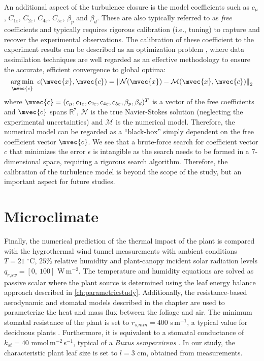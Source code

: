 An additional aspect of the turbulence closure is the model coefficients such as $c_{\mu}$, $C_{1\varepsilon}$, $C_{2\varepsilon}$, $C_{4\varepsilon}$, $C_{5\varepsilon}$, $\beta_p$ and $\beta_d$. These are also typically referred to as \textit{free} coefficients and typically requires rigorous calibration (i.e., tuning) to capture and recover the experimental observations. The calibration of these coefficient to the experiment results can be described as an optimization problem \citep{Margheri2014, Duraisamy2018, Couplet2005, Najm2009, Lucor2007, Gorle2015a}, where data assimilation techniques are well regarded as an effective methodology to ensure the accurate, efficient convergence to global optima:
\begin{equation}
\mathop {\arg \min }\limits_{\mvec{c}}\ \epsilon(\mvec{x}, \mvec{c}) = \left\| {\mathcal{N}(\mvec{x}) - \mathcal{M}(\mvec{x},\mvec{c})} \right\|_2 
\end{equation}
where $\mvec{c}=({{c_\mu },{c_{1\varepsilon }},{c_{2\varepsilon }},{c_{4\varepsilon }},{c_{5\varepsilon }},{\beta _p},{\beta _d}})^T$ is a vector of the free coefficients and $\mvec{c}$ spans $\mathbb{R}^7$, $\mathcal{N}$ is the true Navier-Stokes solution (neglecting the experimental uncertainties) and $\mathcal{M}$ is the numerical model. Therefore, the numerical model can be regarded as a ``black-box'' simply dependent on the free coefficient vector $\mvec{c}$. We see that a brute-force search for coefficient vector $c$ that minimizes the error $\epsilon$ is intangible as the search needs to be formed in a 7-dimensional space, requiring a rigorous search algorithm. Therefore, the calibration of the turbulence model is beyond the scope of the study, but an important aspect for future studies. 

\section{Microclimate}
\label{sec:Microclimate}

Finally, the numerical prediction of the thermal impact of the plant is compared with the hygrothermal wind tunnel measurements with ambient conditions $T = 21$ $^{\circ}$C, $25$\% relative humidity and plant-canopy incident solar radiation levels $q_{\textit{r,sw}} = \left[0,\ 100\right]$ W\,m$^{-2}$. The temperature and humidity equations are solved as passive scalar where the plant source is determined using the leaf energy balance approach described in \cref{ch:parametricstudy}. Additionally, the resistance-based aerodynamic and stomatal models described in the chapter are used to parameterize the heat and mass flux between the foliage and air. The minimum stomatal resistance of the plant is set to $r_{\textit{s,min}} = 400$ s\,m$^{-1}$, a typical value for deciduous plants \citep{Baille1994,Bruse1998}. Furthermore, it is equivalent to a stomatal conductance of $k_{\textit{st}} = 40$ mmol\,m$^{-2}$\,s$^{-1}$, typical of a \textit{Buxus} \textit{sempervirens} \citep{Rodriguez-Calcerrada2013a,Letts2012}. In our study, the characteristic plant leaf size is set to $l=3$ cm, obtained from measurements.

